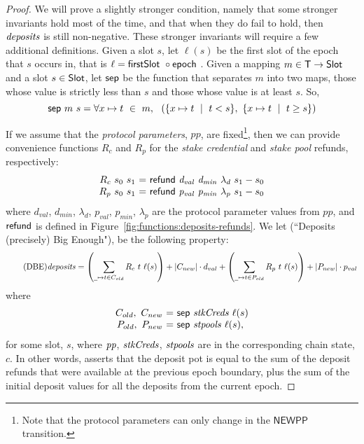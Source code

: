 \begin{proof}

  We will prove a slightly stronger condition, namely that some stronger invariants hold
  most of the time, and that when they do fail to hold, then $\mathit{deposits}$ is still non-negative.
  These stronger invariants will require a few additional definitions.
%
  Given a slot $s$, let $\ell(s)$ be the first slot of the epoch that $s$ occurs in,
  that is $\ell = \mathsf{firstSlot}~ \mathit{}\circ\mathsf{epoch}~ \mathit{}$.
  Given a mapping $m\in\mathsf{T}\to\mathsf{Slot}$ and a slot $s\in\mathsf{Slot}$,
  let $\mathsf{sep}$ be the function that separates $m$ into two maps,
  those whose value is strictly less than $s$ and those whose value is at least $s$.
  So,
  \begin{equation*}
    \mathsf{sep}~m~s = \forall x\mapsto t~\in~m,~~
    \left(\{x\mapsto t~\mid~t<s\},~\{x\mapsto t~\mid~t\geq s\}\right)
  \end{equation*}


  \noindent
  If we assume that the \emph{protocol parameters}, $pp$, are fixed\footnote{Note that the
    protocol parameters can only change in the $\mathsf{NEWPP}$ transition.}, then we can provide convenience functions
  $R_c$ and $R_p$ for the \emph{stake credential} and \emph{stake pool} refunds, respectively:
  \begin{equation*}
    \begin{array}{r@{~=~}l}
      R_c~s_0~s_1 & \refund{d_{val}}{d_{min}}{\lambda_d}{s_1-s_0} \\
      R_p~s_0~s_1 & \refund{p_{val}}{p_{min}}{\lambda_p}{s_1-s_0} \\
    \end{array}
  \end{equation*}
  where $d_{val}$, $d_{min}$, $\lambda_d$, $p_{val}$, $p_{min}$, $\lambda_p$
  are the protocol parameter values from $pp$, and $\mathsf{refund}$ is defined in
  Figure~\ref{fig:functions:deposits-refunds}.
  We let  (``Deposits (precisely) Big Enough"), be the following property:
  \begin{equation}\tag{DBE}\label{DBE}
    \var{deposits}
    = \left(\sum_{\wcard\mapsto t\in C_{old}}R_c~t~\ell(s)\right)
    + |C_{new}|\cdot d_{val}
    + \left(\sum_{\wcard\mapsto t\in P_{old}}R_p~t~\ell(s)\right)
    + |P_{new}|\cdot p_{val}
  \end{equation}
  where
  \begin{equation*}
    \begin{array}{r@{~=~}l}
      C_{old},~C_{new} & \fun{sep}~\var{stkCreds}~{\ell(s)} \\
      P_{old},~P_{new} & \fun{sep}~\var{stpools}~{\ell(s)},
    \end{array}
  \end{equation*}
  for some slot, $s$, where $\mathit{pp}$, $\mathit{stkCreds}$, $\mathit{stpools}$ are in the corresponding chain state, $c$.
%
  In other words,  asserts that the deposit pot is equal to the
  sum of the deposit refunds that were available at the previous epoch boundary,
  plus the sum of the initial deposit values for all the deposits from the current epoch.


\end{proof}
